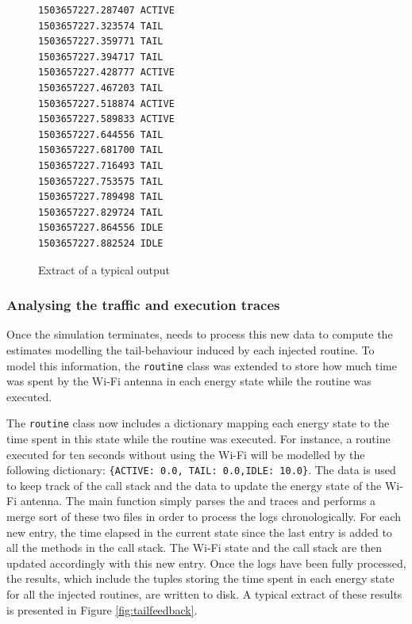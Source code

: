\begin{figure}
\begin{lstlisting}
1503657227.287407 ACTIVE
1503657227.323574 TAIL
1503657227.359771 TAIL
1503657227.394717 TAIL
1503657227.428777 ACTIVE
1503657227.467203 TAIL
1503657227.518874 ACTIVE
1503657227.589833 ACTIVE
1503657227.644556 TAIL
1503657227.681700 TAIL
1503657227.716493 TAIL
1503657227.753575 TAIL
1503657227.789498 TAIL
1503657227.829724 TAIL
1503657227.864556 IDLE
1503657227.882524 IDLE
\end{lstlisting}
\caption{Extract of a typical \netstats{} output}
\label{fig:netstats}
\vspace {-0.32in}
\end{figure}

\subsubsection{Analysing the traffic and execution traces}

Once the simulation terminates, \Orka{} needs to process this new data 
to compute the estimates modelling the tail-behaviour induced by each 
injected routine. To model this information, the \texttt{routine} class 
was extended to store how much time was spent by the Wi-Fi antenna in 
each energy state while the routine was executed.

The \texttt{routine} class now includes a dictionary mapping each energy 
state to the time spent in this state while the routine was executed. 
For instance, a routine executed for ten seconds without using the Wi-Fi 
will be modelled by the following dictionary: 
\texttt{\{\textquotesingle{}ACTIVE\textquotesingle{}: 0.0, 
\textquotesingle{}TAIL\textquotesingle{}: 
0.0,\textquotesingle{}IDLE\textquotesingle{}: 10.0\}}. The \logcat{} 
data is used to keep track of the call stack and the \netstats{} data to 
update the energy state of the Wi-Fi antenna. The main function simply 
parses the \logcat{} and \netstats{} traces and performs a merge sort of 
these two files in order to process the logs chronologically. For each 
new entry, the time elapsed in the current state since the last entry is 
added to all the methods in the call stack. The Wi-Fi state and the call 
stack are then updated accordingly with this new entry. Once the logs 
have been fully processed, the results, which include the tuples storing 
the time spent in each energy state for all the injected routines, are 
written to disk. A typical extract of these results is presented in 
Figure \ref{fig:tailfeedback}.

